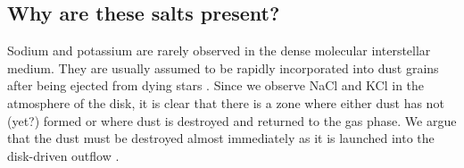 \documentclass[twocolumn]{aastex62}
\begin{document}



%



\subsection{Why are these salts present?}

Sodium and potassium are rarely observed in the dense molecular interstellar
medium.  They are usually assumed to be rapidly incorporated into dust grains
after being ejected from dying stars \citep[e.g.,][]{Milam2007a}.  Since we
observe NaCl and KCl in the atmosphere of the disk, it is clear that
there is a zone where either dust has not (yet?) formed or
where dust is destroyed and returned to the gas phase.  We argue that the dust
must be destroyed almost immediately as it is launched into the disk-driven
outflow \citep{Hirota2017a}.

\end{document}
